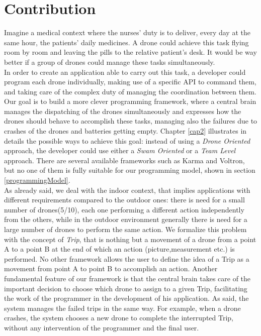 \section{Contribution}

Imagine a medical context where the nurses' duty is to deliver, every day at the same hour, the patients' daily medicines.
A drone could achieve this task flying room by room and leaving the pills to the relative patient's desk. 
It would be way better if a group of drones could manage these tasks simultaneously.
\\

In order to create an application able to carry out this task, a developer could program each drone individually, making use of a specific API to command them, and taking care of the complex duty of managing the coordination between them. 
Our goal is to build a more clever programming framework, where a central brain manages the dispatching of the drones simultaneously and expresses how the drones should behave to accomplish these tasks, managing also the failures due to crashes of the drones and batteries getting empty. 
Chapter \ref{cap2} illustrates in details the possible ways to achieve this goal:
instead of using a \textit{Drone Oriented} approach, the developer could use either a \textit{Swam Oriented} or a \textit{Team Level} approach. 
There are several available frameworks such as Karma\cite{karma} and Voltron\cite{voltron}, but no one of them is fully suitable for our programming model, shown in section \ref{programmingModel}.
\\

As already said, we deal with the indoor context, that implies applications with different requirements compared to the outdoor ones:
there is need for a small number of drones(5/10), each one performing a different action independently from the others, while in the outdoor environment generally there is need for a large number of drones to perform the same action.
We formalize this problem with the concept of \textit{Trip}, that is nothing but a movement of a drone from a point A to a point B at the end of which an action (picture,measurement etc.) is performed. 
No other framework allows the user to define the idea of a Trip as a movement from point A to point B to accomplish an action.
Another fundamental feature of our framework is that the central brain takes care of the important decision to choose which drone to assign to a given Trip, facilitating the work of the programmer in the development of his application.
As said, the system manages the failed trips in the same way.
For example, when a drone crashes, the system chooses a new drone to complete the interrupted Trip, without any intervention of the programmer and the final user.
\\


